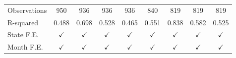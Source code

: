 \begin{tabular}{lcccccccc}
\arrayrulecolor{black!10}\midrule
Observations        &         950         &         936         &         936         &         936         &         840         &         819         &         819         &         819         \\
R-squared           &       0.488         &       0.698         &       0.528         &       0.465         &       0.551         &       0.838         &       0.582         &       0.525         \\
State F.E.          &$\checkmark$         &$\checkmark$         &$\checkmark$         &$\checkmark$         &$\checkmark$         &$\checkmark$         &$\checkmark$         &$\checkmark$         \\
Month F.E.          &$\checkmark$         &$\checkmark$         &$\checkmark$         &$\checkmark$         &$\checkmark$         &$\checkmark$         &$\checkmark$         &$\checkmark$         \\



\end{tabular}
